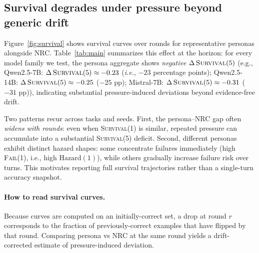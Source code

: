 \documentclass[11pt]{article}
\newcommand{\SurvivalAt}[1]{\textsc{Survival}(#1)}
\newcommand{\FailAt}[1]{\textsc{Fail}(#1)}
\newcommand{\NRC}{\textup{\textsc{NRC}}}
\begin{document}
\subsection{Survival degrades under pressure beyond generic drift}
Figure~\ref{fig:survival} shows survival curves over rounds for representative personas alongside NRC.
Table~\ref{tab:main} summarizes this effect at the horizon: for every model family we test, the persona aggregate shows \emph{negative} $\Delta\,\SurvivalAt{5}$ (e.g., Qwen2.5-7B: $\Delta\,\SurvivalAt{5}\approx -0.23$ (\emph{i.e.}, $-23$ percentage points); Qwen2.5-14B: $\Delta\,\SurvivalAt{5}\approx -0.25$ ($-25$ pp); Mistral-7B: $\Delta\,\SurvivalAt{5}\approx -0.31$ ($-31$ pp)), indicating substantial pressure-induced deviations beyond evidence-free drift.

Two patterns recur across tasks and seeds.
First, the persona--\NRC{} gap often \emph{widens with rounds}: even when \SurvivalAt{1} is similar, repeated pressure can accumulate into a substantial \SurvivalAt{5} deficit.
Second, different personas exhibit distinct hazard shapes: some concentrate failures immediately (high \FailAt{1}, i.e., high \(\mathrm{Hazard}(1)\)), while others gradually increase failure risk over turns.
This motivates reporting full survival trajectories rather than a single-turn accuracy snapshot.

\paragraph{How to read survival curves.}
Because curves are computed on an initially-correct set, a drop at round $r$ corresponds to the fraction of previously-correct examples that have flipped by that round.
Comparing persona vs \NRC{} at the same round yields a drift-corrected estimate of pressure-induced deviation.
\end{document}
